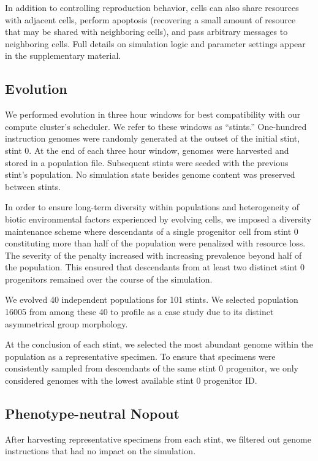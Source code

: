 In addition to controlling reproduction behavior, cells can also share resources with adjacent cells, perform apoptosis (recovering a small amount of resource that may be shared with neighboring cells), and pass arbitrary messages to neighboring cells.
Full details on simulation logic and parameter settings appear in the supplementary material.

\subsection{Evolution}

We performed evolution in three hour windows for best compatibility with our compute cluster's scheduler.
We refer to these windows as ``stints.''
One-hundred instruction genomes were randomly generated at the outset of the initial stint, stint 0.
At the end of each three hour window, genomes were harvested and stored in a population file.
Subsequent stints were seeded with the previous stint's population.
No simulation state besides genome content was preserved between stints.

In order to ensure long-term diversity within populations and heterogeneity of biotic environmental factors experienced by evolving cells, we imposed a diversity maintenance scheme where descendants of a single progenitor cell from stint 0 constituting more than half of the population were penalized with resource loss.
The severity of the penalty increased with increasing prevalence beyond half of the population.
This ensured that descendants from at least two distinct stint 0 progenitors remained over the course of the simulation. 

We evolved 40 independent populations for 101 stints.
We selected population 16005 from among these 40 to profile as a case study due to its distinct asymmetrical group morphology.

At the conclusion of each stint, we selected the most abundant genome within the population as a representative specimen.
To ensure that specimens were consistently sampled from descendants of the same stint 0 progenitor, we only considered genomes with the lowest available stint 0 progenitor ID.

\subsection{Phenotype-neutral Nopout}

After harvesting representative specimens from each stint, we filtered out genome instructions that had no impact on the simulation.

